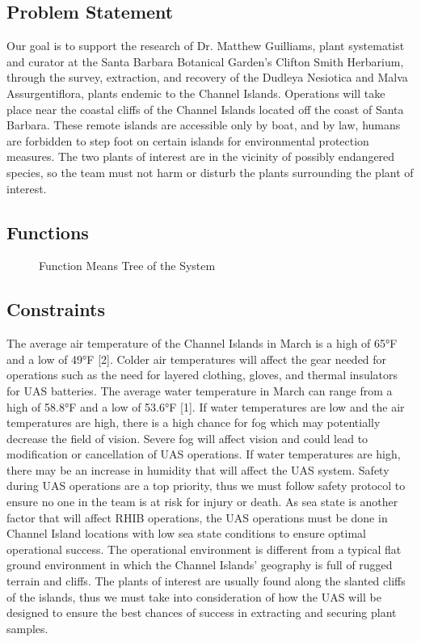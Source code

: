 \documentclass{wrcecapstone}
\begin{document}
\subsection{Problem Statement}
Our goal is to support the research of Dr. Matthew Guilliams, plant systematist and curator at the Santa Barbara Botanical Garden's Clifton Smith Herbarium, through the survey, extraction, and recovery of the Dudleya Nesiotica and Malva Assurgentiflora, plants endemic to the Channel Islands. Operations will take place near the coastal cliffs of the Channel Islands located off the coast of Santa Barbara. These remote islands are accessible only by boat, and by law, humans are forbidden to step foot on certain islands for environmental protection measures. The two plants of interest are in the vicinity of possibly endangered species, so the team must not harm or disturb the plants surrounding the plant of interest. 

\subsection{Functions}
\begin{figure}
\caption{Function Means Tree of the System}
\end{figure}

\subsection{Constraints}
The average air temperature of the Channel Islands in March is a high of 65°F and a low of 49°F [2]. Colder air temperatures will affect the gear needed for operations such as the need for layered clothing, gloves, and thermal insulators for UAS batteries. The average water temperature in March can range from a high of 58.8°F and a low of 53.6°F [1]. If water temperatures are low and the air temperatures are high, there is a high chance for fog which may potentially decrease the field of vision. Severe fog will affect vision and could lead to modification or cancellation of UAS operations. If water temperatures are high, there may be an increase in humidity that will affect the UAS system. Safety during UAS operations are a top priority, thus we must follow safety protocol to ensure no one in the team is at risk for injury or death. As sea state is another factor that will affect RHIB operations, the UAS operations must be done in Channel Island locations with low sea state conditions to ensure optimal operational success. The operational environment is different from a typical flat ground environment in which the Channel Islands’ geography is full of rugged terrain and cliffs. The plants of interest are usually found along the slanted cliffs of the islands, thus we must take into consideration of how the UAS will be designed to ensure the best chances of success in extracting and securing plant samples. 
\end{document}
